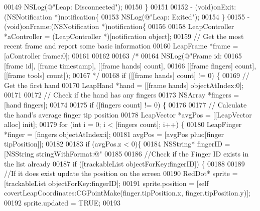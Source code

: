 \begin{DoxyCode}
{{00149     NSLog(\textcolor{stringliteral}{@"Leap: Disconnected"});
00150 \}
00151 
00152 - (void)onExit:(NSNotification *)notification\{
00153     NSLog(\textcolor{stringliteral}{@"Leap: Exited"});
00154 \}
00155 - (void)onFrame:(NSNotification *)notification\{
00156     
00158     LeapController *aController = (LeapController *)[notification \textcolor{keywordtype}{object}];
00159     \textcolor{comment}{// Get the most recent frame and report some basic information}
00160     LeapFrame *frame = [aController frame:0];
00161     
00162     
00163     \textcolor{comment}{/*}
00164 \textcolor{comment}{     NSLog(@"Frame id: %
00165 \textcolor{comment}{     [frame id], [frame timestamp], [[frame hands] count],}
00166 \textcolor{comment}{     [[frame fingers] count], [[frame tools] count]);}
00167 \textcolor{comment}{     */}
00168     \textcolor{keywordflow}{if} ([[frame hands] count] != 0) \{
00169         \textcolor{comment}{// Get the first hand}
00170         LeapHand *hand = [[frame hands] objectAtIndex:0];
00171         
00172         \textcolor{comment}{// Check if the hand has any fingers}
00173         NSArray *fingers = [hand fingers];
00174         
00175         \textcolor{keywordflow}{if} ([fingers count] != 0) \{
00176             
00177             \textcolor{comment}{// Calculate the hand's average finger tip position}
00178             LeapVector *avgPos = [[LeapVector alloc] init];
00179             \textcolor{keywordflow}{for} (\textcolor{keywordtype}{int} i = 0; i < [fingers count]; i++) \{
00180                 LeapFinger *finger = [fingers objectAtIndex:i];
00181                 avgPos = [avgPos plus:[finger tipPosition]];
00182                 
00183                 \textcolor{keywordflow}{if} (avgPos.z < 0)\{
00184                     NSString* fingerID = [NSString stringWithFormat:@"%
00185                     
00186                     \textcolor{comment}{//Check if the Finger ID exists in the list already}
00187                     \textcolor{keywordflow}{if} ([trackableList objectForKey:fingerID]) \{
00188                         
00189                         \textcolor{comment}{//If it does exist update the position on the screen}
00190                         RedDot* sprite = [trackableList objectForKey:fingerID];
00191                         sprite.position = [\textcolor{keyword}{self} covertLeapCoordinates:CGPointMake(finger.tipPosition.x, 
      finger.tipPosition.y)];
00192                         sprite.updated = TRUE;
00193                         
}}}
\end{DoxyCode}
